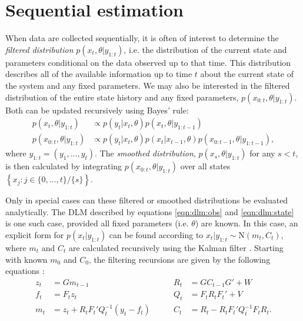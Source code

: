 \section{Sequential estimation \label{sec:sequential}}

When data are collected sequentially, it is often of interest to determine the \emph{filtered distribution} $p(x_t,\theta|y_{1:t})$, i.e. the distribution of the current state and parameters conditional on the data observed up to that time. This distribution describes all of the available information up to time $t$ about the current state of the system and any fixed parameters. We may also be interested in the filtered distribution of the entire state history and any fixed parameters, $p(x_{0:t},\theta|y_{1:t})$. Both can be updated recursively using Bayes' rule:
\begin{align}
p(x_t,\theta| y_{1:t}) &\propto p(y_t|x_t,\theta)p(x_t,\theta|y_{1:t-1}) \label{eqn:filtered} \\
p(x_{0:t},\theta|y_{1:t}) &\propto p(y_t|x_t,\theta)p(x_t|x_{t-1},\theta)p(x_{0:t-1},\theta|y_{1:t-1}), \label{eqn:filtered:hist}
\end{align}
where $y_{1:t} = (y_1,\ldots,y_t)$. The \emph{smoothed distribution}, $p(x_s,\theta|y_{1:t})$ for any $s < t$, is then calculated by integrating $p(x_{0:t},\theta|y_{1:t})$ over all states $\left\{x_j: j \in \{0,\ldots,t\} / \{s\}\right\}$.

Only in special cases can these filtered or smoothed distributions be evaluated analytically. The DLM described by equations \eqref{eqn:dlm:obs} and \eqref{eqn:dlm:state} is one such case, provided all fixed parameters (i.e. $\theta$) are known. In this case, an explicit form for $p(x_t|y_{1:t})$ can be found according to $x_t|y_{1:t} \sim \mbox{N}(m_t,C_t)$, where $m_t$ and $C_t$ are calculated recursively using the Kalman filter \citep{kal:1960:ekf}. Starting with known $m_0$ and $C_0$, the filtering recursions are given by the following equations \cite[Section 2.7.2][]{petris:camp:2009:dynamic}:
\begin{align}
z_t &= Gm_{t-1} &\qquad R_t &= GC_{t-1}G' + W \label{eqn:dlm:kal} \\
f_t &= F_tz_t &\qquad Q_t &= F_tR_tF_t' + V \nonumber \\
m_t &= z_t + R_tF_t'Q_t^{-1}(y_t-f_t) &\qquad C_t &= R_t - R_tF_t'Q_t^{-1}F_tR_t. \nonumber
\end{align}

